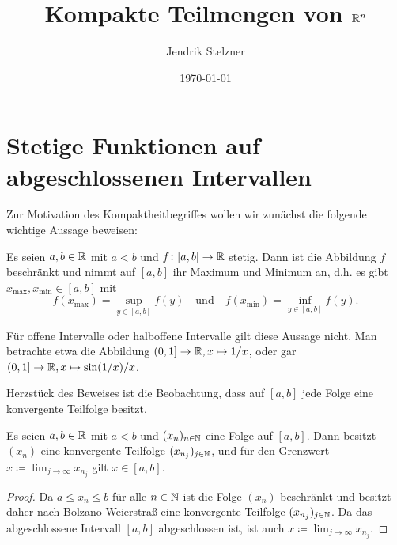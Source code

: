 \documentclass[a4paper,10pt]{article}
\title{Kompakte Teilmengen von $\mathbb{R}^n$}
\author{Jendrik Stelzner}
\date{\today}
\begin{document}
\maketitle

\tableofcontents





\section{Stetige Funktionen auf abgeschlossenen Intervallen}


Zur Motivation des Kompaktheitbegriffes wollen wir zunächst die folgende wichtige Aussage beweisen:


\begin{lem}\label{lem: stetig auf Intervall}
 Es seien $a,b \in \mathbb{R}$ mit $a < b$ und $f \colon [a,b] \to \mathbb{R}$ stetig. Dann ist die Abbildung $f$ beschränkt und nimmt auf $[a,b]$ ihr Maximum und Minimum an, d.h. es gibt $x_{\text{max}}, x_{\text{min}} \in [a,b]$ mit
 \[
  f(x_{\text{max}}) = \sup_{y \in [a,b]} f(y)
  \quad
  \text{und}
  \quad
  f(x_{\text{min}}) = \inf_{y \in [a,b]} f(y).
 \]
\end{lem}


Für offene Intervalle oder halboffene Intervalle gilt diese Aussage nicht. Man betrachte etwa die Abbildung $(0,1] \to \mathbb{R}, x \mapsto 1/x$, oder gar $(0,1] \to \mathbb{R}, x \mapsto \sin(1/x)/x$.


Herzstück des Beweises ist die Beobachtung, dass auf $[a,b]$ jede Folge eine konvergente Teilfolge besitzt.


\begin{lem}\label{lem: Intervall ist kompakt}
 Es seien $a,b \in \mathbb{R}$ mit $a < b$ und $(x_n)_{n \in \mathbb{N}}$ eine Folge auf $[a,b]$. Dann besitzt $(x_n)$ eine konvergente Teilfolge $(x_{n_j})_{j \in \mathbb{N}}$, und für den Grenzwert $x \coloneqq \lim_{j \to \infty} x_{n_j}$ gilt $x \in [a,b]$.
\end{lem}
\begin{proof}
 Da $a \leq x_n \leq b$ für alle $n \in \mathbb{N}$ ist die Folge $(x_n)$ beschränkt und besitzt daher nach Bolzano-Weierstraß eine konvergente Teilfolge $(x_{n_j})_{j \in \mathbb{N}}$. Da das abgeschlossene Intervall $[a,b]$ abgeschlossen ist, ist auch $x \coloneqq \lim_{j \to \infty} x_{n_j}$.
\end{proof}
\end{document}
